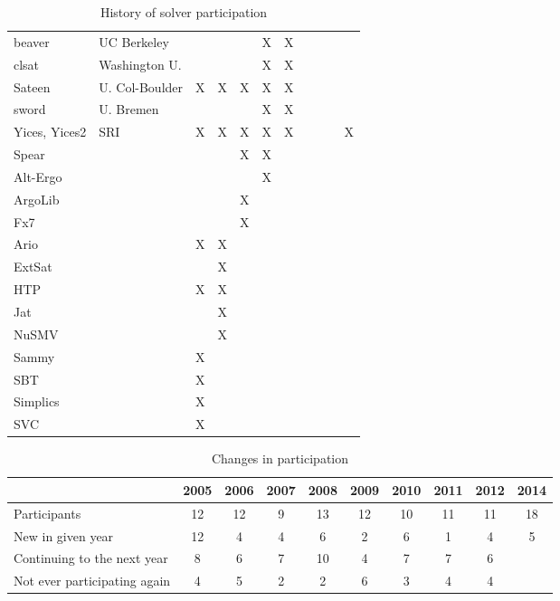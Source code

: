 \documentclass[twosize,11pt]{article}
\begin{document}
\begin{table}[t]
\begin{tabular}{|l|l|c|c|c|c|c|c|c|c|c|}
beaver                 & UC Berkeley   &   &   &   & X & X &   &   &   &   \\		
clsat                  & Washington U.  &   &   &   & X & X &   &   &   &   \\		
Sateen                 & U. Col-Boulder & X & X & X & X & X &   &   &   &   \\		
sword                  & U. Bremen      &   &   &   & X & X &   &   &   &   \\		
Yices, Yices2          & SRI            & X & X & X & X & X &   &   &   & X \\		
Spear                  &   &   &   & X & X &   &   &   &   \\		
Alt-Ergo               &   &   &   &   & X &   &   &   &   \\			
ArgoLib                &   &   &   & X &   &   &   &   &   \\				
Fx7                    &   &   &   & X &   &   &   &   &   \\				
Ario                   &   & X & X &   &   &   &   &   &   \\					
ExtSat                 &   &   & X &   &   &   &   &   &   \\					
HTP                    &   & X & X &   &   &   &   &   &   \\					
Jat                    &   &   & X &   &   &   &   &   &   \\					
NuSMV                  &   &   & X &   &   &   &   &   &   \\					
Sammy                  &   & X &   &   &   &   &   &   &   \\						
SBT                    &   & X &   &   &   &   &   &   &   \\						
Simplics               &   & X &   &   &   &   &   &   &   \\					
SVC	                   &   & X &   &   &   &   &   &   &   \\	
\hline					
\end{tabular}
\vspace{.2in}
\caption{History of solver participation}
\label{Table:participants}
\end{table}

\begin{table}
\centering
\begin{tabular}{|l|c|c|c|c|c|c|c|c|c|}
\hline
 & 2005 & 2006 & 2007 & 2008 & 2009 & 2010 & 2011 & 2012 & 2014\\
\hline
Participants                 & 12 & 12 & 9 & 13 & 12 & 10 & 11 & 11 & 18 \\
New in given year            & 12 &  4 & 4 &  6 &  2 &  6 &  1 &  4 & 5 \\
Continuing to the next year  &  8 &  6 & 7 & 10 &  4 &  7 &  7 &  6 &  \\
Not ever participating again &  4 &  5 & 2 &  2 &  6 &  3 &  4 &  4 &  \\ 
\hline
\end{tabular}
\vspace{.2in}
\caption{Changes in participation}
\label{Table:changes}
\end{table}
\end{document}
